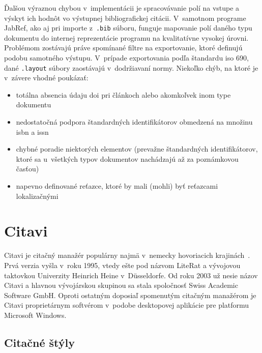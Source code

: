 \documentclass[
  color,
  table,
  nolof,
  oneside,
]{fithesis3}
\begin{document}


Ďalšou výraznou chybou v~implementácii je spracovávanie polí na vstupe a výskyt ich hodnôt vo výstupnej bibliografickej citácii. V~samotnom programe JabRef, ako aj pri importe z~\texttt{.bib} súboru, funguje mapovanie polí daného typu dokumentu do internej reprezentácie programu na kvalitatívne vysokej úrovni. Problémom zostávajú práve spomínané filtre na exportovanie, ktoré definujú podobu samotného výstupu. V~prípade exportovania podľa štandardu \gls{iso} 690, dané \texttt{.layout} súbory zaostávajú v~dodržiavaní normy. Niekoľko chýb, na ktoré je v~závere vhodné poukázať:

\begin{itemize}
\item totálna absencia údaju \gls{doi} pri článkoch alebo akomkoľvek inom type dokumentu
\item nedostatočná podpora štandardných identifikátorov obmedzená na množinu \gls{isbn} a \gls{issn}
\item chybné poradie niektorých elementov (prevažne štandardných identifikátorov, ktoré sa u~všetkých typov dokumentov nachádzajú až za poznámkovou časťou)
\item napevno definované reťazce, ktoré by mali (mohli) byť reťazcami lokalizačnými
\end{itemize}

\section{Citavi}

Citavi je citačný manažér populárny najmä v~nemecky hovoriacich krajinách~\cite{Stohr2010}. Prvá verzia vyšla v~roku 1995, vtedy ešte pod názvom LiteRat a vývojovou taktovkou Univerzity Heinrich Heine v~Düsseldorfe. Od roku 2003 už nesie názov Citavi a hlavnou vývojárskou skupinou sa stala spoločnosť Swiss Academic Software GmbH. Oproti ostatným doposiaľ spomenutým citačným manažérom je Citavi proprietárnym softvérom v~podobe desktopovej aplikácie pre platformu Microsoft Windows.

\subsection{Citačné štýly}
\end{document}
